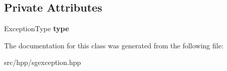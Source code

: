 \subsection*{Private Attributes}
\begin{DoxyCompactItemize}
\item 
\hypertarget{class_s_g_exception_a66757f63f2068a7d8035df59a8887312}{Exception\+Type {\bfseries type}}\label{class_s_g_exception_a66757f63f2068a7d8035df59a8887312}

\end{DoxyCompactItemize}


The documentation for this class was generated from the following file\+:\begin{DoxyCompactItemize}
\item 
src/hpp/sgexception.\+hpp\end{DoxyCompactItemize}
